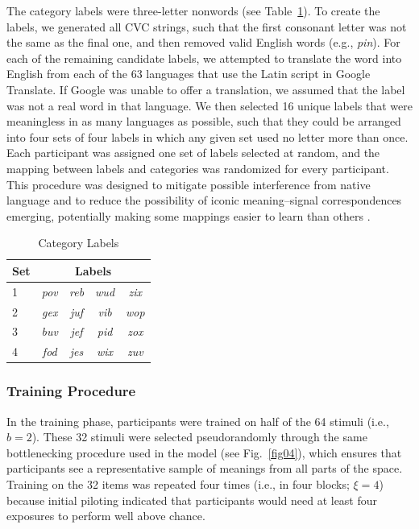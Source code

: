\documentclass[doc,biblatex]{apa7}
\begin{document}
The category labels were three-letter nonwords (see Table~\ref{category_labels}). To create the labels, we generated all CVC strings, such that the first consonant letter was not the same as the final one, and then removed valid English words (e.g., \textit{pin}). For each of the remaining candidate labels, we attempted to translate the word into English from each of the 63 languages that use the Latin script in Google Translate. If Google was unable to offer a translation, we assumed that the label was not a real word in that language. We then selected 16 unique labels that were meaningless in as many languages as possible, such that they could be arranged into four sets of four labels in which any given set used no letter more than once. Each participant was assigned one set of labels selected at random, and the mapping between labels and categories was randomized for every participant. This procedure was designed to mitigate possible interference from native language and to reduce the possibility of iconic meaning--signal correspondences emerging, potentially making some mappings easier to learn than others \parencite[see e.g.,][]{Nygaard:2009,Nielsen:2012}.

	\begin{table}
	\begin{center}
	\begin{threeparttable}
	\caption{Category Labels}
	\begin{tabular}{lcccc}
	\hline
	\bfseries Set & \multicolumn{4}{c}{\bfseries Labels} \\ \hline
	1 & \textit{pov} & \textit{reb} & \textit{wud} & \textit{zix} \\
	2 & \textit{gex} & \textit{juf} & \textit{vib} & \textit{wop} \\
	3 & \textit{buv} & \textit{jef} & \textit{pid} & \textit{zox} \\
	4 & \textit{fod} & \textit{jes} & \textit{wix} & \textit{zuv} \\ \hline
	\end{tabular}
	\label{category_labels}
	\end{threeparttable}
	\end{center}
	\end{table}

\subsubsection{Training Procedure}

In the training phase, participants were trained on half of the 64 stimuli (i.e., $b=2$). These 32 stimuli were selected pseudorandomly through the same bottlenecking procedure used in the model (see Fig.~\ref{fig04}), which ensures that participants see a representative sample of meanings from all parts of the space. Training on the 32 items was repeated four times (i.e., in four blocks; $\xi=4$) because initial piloting indicated that participants would need at least four exposures to perform well above chance.
\end{document}
